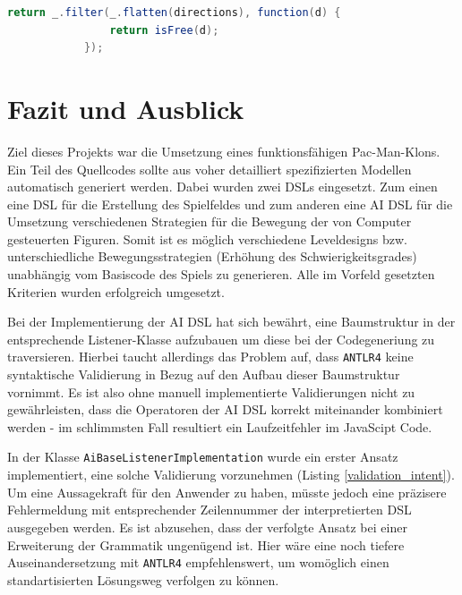 \documentclass[conference]{IEEEtran}
\begin{document}
\begin{lstlisting}[language=Java, captionpos=b, caption=Implementierung der Filter-Free Methode mit Hilfe von funktionalen Hilfsmitteln von underscore.js, label=underscore_speaking]
return _.filter(_.flatten(directions), function(d) {
                return isFree(d);
            });
\end{lstlisting}


\section{Fazit und Ausblick}
Ziel dieses Projekts war die Umsetzung eines funktionsfähigen Pac-Man-Klons. Ein Teil des Quellcodes sollte aus voher detailliert spezifizierten Modellen automatisch generiert werden.  Dabei wurden zwei DSLs eingesetzt. Zum einen eine DSL für die Erstellung des Spielfeldes und zum anderen eine AI DSL für die Umsetzung verschiedenen Strategien für die Bewegung der von Computer gesteuerten Figuren. Somit ist es möglich verschiedene Leveldesigns bzw. unterschiedliche Bewegungsstrategien (Erhöhung des Schwierigkeitsgrades) unabhängig vom Basiscode des Spiels zu generieren. Alle im Vorfeld gesetzten Kriterien wurden erfolgreich umgesetzt.

Bei der Implementierung der AI DSL hat sich bewährt, eine Baumstruktur in der entsprechende Listener-Klasse aufzubauen um diese bei der Codegeneriung zu traversieren. Hierbei taucht allerdings das Problem auf, dass \texttt{ANTLR4} keine syntaktische Validierung in Bezug auf den Aufbau dieser Baumstruktur vornimmt. Es ist also ohne manuell implementierte Validierungen nicht zu gewährleisten, dass die Operatoren der AI DSL korrekt miteinander kombiniert werden - im schlimmsten Fall resultiert ein Laufzeitfehler im JavaScipt Code.

In der Klasse \texttt{AiBaseListenerImplementation} wurde ein erster Ansatz implementiert, eine solche Validierung vorzunehmen (Listing \ref{validation_intent}). Um eine Aussagekraft für den Anwender zu haben, müsste jedoch eine präzisere Fehlermeldung mit entsprechender Zeilennummer der interpretierten DSL ausgegeben werden. Es ist abzusehen, dass der verfolgte Ansatz bei einer Erweiterung der Grammatik ungenügend ist. Hier wäre eine noch tiefere Auseinandersetzung mit \texttt{ANTLR4} empfehlenswert, um womöglich einen standartisierten Lösungsweg verfolgen zu können.
\end{document}
